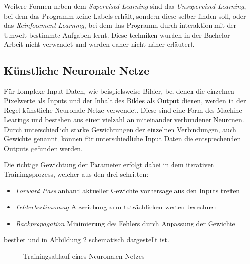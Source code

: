 Weitere Formen neben dem \textit{Supervised Learning} sind das 
\textit{Unsupervised Learning}, bei dem das Programm keine Labels 
erhält, sondern diese selber finden 
soll, oder das \textit{Reinfocement Learning}, bei dem das Programm 
durch interaktion mit der Umwelt bestimmte Aufgaben lernt.
Diese techniken wurden in der Bachelor Arbeit nicht verwendet 
und werden daher nicht näher erläutert.



\newpage
\subsection{Künstliche Neuronale Netze} \label{subsec:nn}

Für komplexe Input Daten, wie beispielsweise Bilder, bei denen 
die einzelnen Pixelwerte als Inputs und der Inhalt des Bildes als 
Output dienen, werden in der Regel künstliche Neuronale Netze verwendet.
Diese sind eine Form des Machine Learings und bestehen aus einer 
vielzahl an miteinander verbundener Neuronen. Durch unterschiedlich 
starke Gewichtungen der einzelnen Verbindungen, auch Gewichte genannt, 
können für unterschiedliche Input Daten die entsprechenden Outputs 
gefunden werden.

\vspace{1cm}
\begin{figure}[H]
    \centering
    \label{fig:nn}
    \def\svgwidth{0.85\columnwidth}
    \footnotesize
    
\end{figure}
\vspace{1cm}

Die richtige Gewichtung der Parameter erfolgt dabei in dem iterativen
Trainingsprozess, welcher aus den drei schritten:


\begin{itemize}
    \item \textit{Forward Pass} anhand aktueller Gewichte vorhersage aus den Inputs treffen
    \item \textit{Fehlerbestimmung} Abweichung zum tatsächlichen werten berechnen
    \item \textit{Backpropagation} Minimierung des Fehlers durch Anpassung der Gewichte
\end{itemize}

besthet und in Abbildung \ref{fig:train} schematisch dargestellt ist.


\vspace{1cm}
\begin{figure}[H]
    \centering
    
    \caption{Trainingsablauf eines Neuronalen Netzes}
    \label{fig:train}
\end{figure}
\vspace{1cm}




